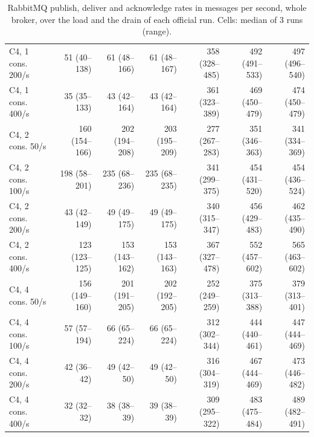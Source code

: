 \documentclass[a4paper]{report}
\begin{document}
\begin{table}[H]
{\begin{tabular}{lrrrrrr}
C4, 1 cons. 200/s & 51 (40--138) & 61 (48--166) & 61 (48--167) & 358 (328--485) & 492 (491--533) & 497 (496--540) \\
C4, 1 cons. 400/s & 35 (35--133) & 43 (42--164) & 43 (42--164) & 361 (323--389) & 469 (450--479) & 474 (450--479) \\
C4, 2 cons. 50/s & 160 (154--166) & 202 (194--208) & 203 (195--209) & 277 (267--283) & 351 (346--363) & 341 (334--369) \\
C4, 2 cons. 100/s & 198 (58--201) & 235 (68--236) & 235 (68--235) & 341 (299--375) & 454 (431--520) & 454 (436--524) \\
C4, 2 cons. 200/s & 43 (42--149) & 49 (49--175) & 49 (49--175) & 340 (315--347) & 456 (429--483) & 462 (435--490) \\
C4, 2 cons. 400/s & 123 (123--125) & 153 (143--162) & 153 (143--163) & 367 (327--478) & 552 (457--602) & 565 (463--602) \\
C4, 4 cons. 50/s & 156 (149--160) & 201 (191--205) & 202 (192--205) & 252 (249--259) & 375 (313--388) & 379 (313--401) \\
C4, 4 cons. 100/s & 57 (57--194) & 66 (65--224) & 66 (65--224) & 312 (302--344) & 444 (440--461) & 447 (444--469) \\
C4, 4 cons. 200/s & 42 (36--42) & 49 (42--50) & 49 (42--50) & 316 (304--319) & 467 (444--469) & 473 (446--482) \\
C4, 4 cons. 400/s & 32 (32--32) & 38 (38--39) & 39 (38--39) & 309 (295--322) & 483 (475--484) & 489 (482--491) \\
\bottomrule
\end{tabular}}
\caption{RabbitMQ publish, deliver and acknowledge rates in messages per
second, whole broker, over the load and the drain of each official run. Cells:
median of 3 runs (range).}
\label{tab:results-broker}
\end{table}
\end{document}
